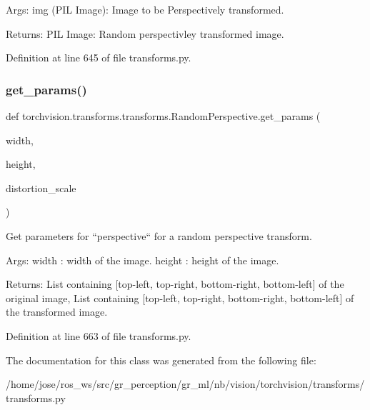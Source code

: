 \begin{DoxyVerb}Args:
    img (PIL Image): Image to be Perspectively transformed.

Returns:
    PIL Image: Random perspectivley transformed image.
\end{DoxyVerb}
 

Definition at line 645 of file transforms.\+py.

\mbox{\label{classtorchvision_1_1transforms_1_1transforms_1_1RandomPerspective_a3f5ee3ba51cbc4eb7b003f7b8172c09f}} 
\subsubsection{\texorpdfstring{get\+\_\+params()}{get\_params()}}
{\footnotesize\ttfamily def torchvision.\+transforms.\+transforms.\+Random\+Perspective.\+get\+\_\+params (\begin{DoxyParamCaption}\item[{}]{width,  }\item[{}]{height,  }\item[{}]{distortion\+\_\+scale }\end{DoxyParamCaption})\hspace{0.3cm}{\ttfamily [static]}}

\begin{DoxyVerb}Get parameters for ``perspective`` for a random perspective transform.

Args:
    width : width of the image.
    height : height of the image.

Returns:
    List containing [top-left, top-right, bottom-right, bottom-left] of the original image,
    List containing [top-left, top-right, bottom-right, bottom-left] of the transformed image.
\end{DoxyVerb}
 

Definition at line 663 of file transforms.\+py.



The documentation for this class was generated from the following file\+:\begin{DoxyCompactItemize}
\item 
/home/jose/ros\+\_\+ws/src/gr\+\_\+perception/gr\+\_\+ml/nb/vision/torchvision/transforms/transforms.\+py\end{DoxyCompactItemize}
